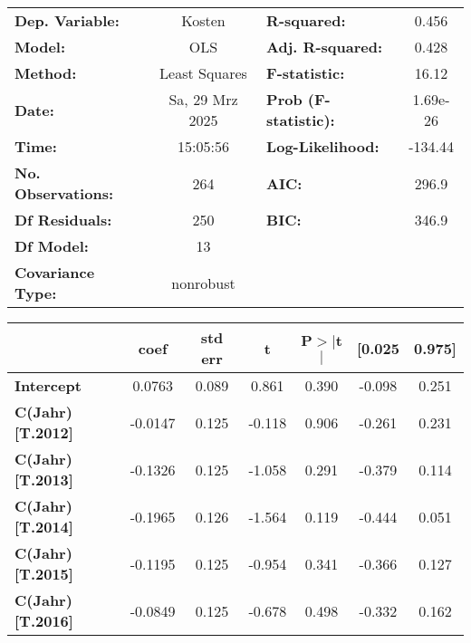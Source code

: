 \begin{center}
\begin{tabular}{lclc}
\toprule
\textbf{Dep. Variable:}    &      Kosten     & \textbf{  R-squared:         } &     0.456   \\
\textbf{Model:}            &       OLS       & \textbf{  Adj. R-squared:    } &     0.428   \\
\textbf{Method:}           &  Least Squares  & \textbf{  F-statistic:       } &     16.12   \\
\textbf{Date:}             & Sa, 29 Mrz 2025 & \textbf{  Prob (F-statistic):} &  1.69e-26   \\
\textbf{Time:}             &     15:05:56    & \textbf{  Log-Likelihood:    } &   -134.44   \\
\textbf{No. Observations:} &         264     & \textbf{  AIC:               } &     296.9   \\
\textbf{Df Residuals:}     &         250     & \textbf{  BIC:               } &     346.9   \\
\textbf{Df Model:}         &          13     & \textbf{                     } &             \\
\textbf{Covariance Type:}  &    nonrobust    & \textbf{                     } &             \\
\bottomrule
\end{tabular}
\begin{tabular}{lcccccc}
                         & \textbf{coef} & \textbf{std err} & \textbf{t} & \textbf{P$> |$t$|$} & \textbf{[0.025} & \textbf{0.975]}  \\
\midrule
\textbf{Intercept}       &       0.0763  &        0.089     &     0.861  &         0.390        &       -0.098    &        0.251     \\
\textbf{C(Jahr)[T.2012]} &      -0.0147  &        0.125     &    -0.118  &         0.906        &       -0.261    &        0.231     \\
\textbf{C(Jahr)[T.2013]} &      -0.1326  &        0.125     &    -1.058  &         0.291        &       -0.379    &        0.114     \\
\textbf{C(Jahr)[T.2014]} &      -0.1965  &        0.126     &    -1.564  &         0.119        &       -0.444    &        0.051     \\
\textbf{C(Jahr)[T.2015]} &      -0.1195  &        0.125     &    -0.954  &         0.341        &       -0.366    &        0.127     \\
\textbf{C(Jahr)[T.2016]} &      -0.0849  &        0.125     &    -0.678  &         0.498        &       -0.332    &        0.162     \\

\end{tabular}
\end{center}
